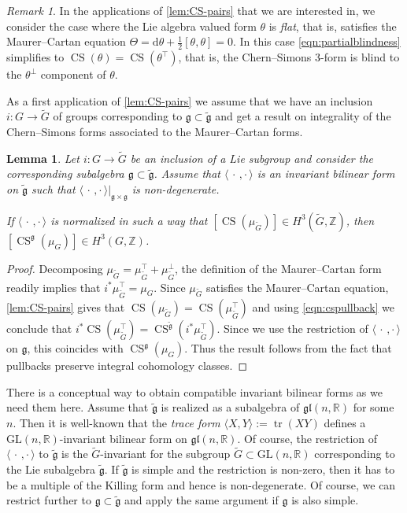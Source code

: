 \documentclass[british,11pt,a4paper]{amsart}
\numberwithin{equation}{section}
\renewcommand\frak{\mathfrak}
\newcommand{\x}{\times}
\newcommand{\deq}{:=}
\newcommand{\B}[2]{\langle#1,#2\rangle}
\newcommand{\CS}{\operatorname{CS}}
\newcommand{\tr}{\operatorname{tr}}
\newcommand{\Z}{\mathbb{Z}}
\renewcommand*{\d}{\mathrm{d}}
\newcommand*{\R}{\mathbb{R}}
\newcommand{\col}{:}
\newcounter{theorem}
\numberwithin{theorem}{section}
\newtheorem{lemma}[theorem]{Lemma}
\theoremstyle{definition}
\theoremstyle{remark}
\newtheorem{remark}[theorem]{Remark}
\begin{document}
\begin{remark}
In the applications of \cref{lem:CS-pairs} that we are interested in, we consider the case where the Lie algebra valued form $\theta$ is \emph{flat}, that is, satisfies the Maurer--Cartan equation $\Theta=\d\theta+\tfrac{1}{2}[\theta,\theta]=0$. In this case \eqref{eqn:partialblindness} simplifies to $\CS(\theta)=\CS(\theta^{\top})$, that is, the Chern--Simons $3$-form is blind to the $\theta^{\perp}$ component of $\theta$. 
\end{remark}

 As a first application of \cref{lem:CS-pairs} we assume that we have an inclusion
$i\col G\to\tilde G$ of groups corresponding to $\frak{g}\subset\tilde{\frak{g}}$ and get a
result on integrality of the Chern--Simons forms associated to the Maurer--Cartan
forms.
\begin{lemma}\label{lem:CS-subgroup}
Let $i\col G\to\tilde G$ be an inclusion of a Lie subgroup and consider the corresponding
subalgebra $\frak{g}\subset\tilde{\frak{g}}$. Assume that $\B{\,\cdot\,}{\cdot\,}$ is an
invariant bilinear form on $\tilde{\frak{g}}$ such that $\B{\,\cdot\,}{\cdot\,}|_{\frak{g}\x\frak
g}$ is non-degenerate.

If $\B{\,\cdot\,}{\cdot\,}$ is normalized in such a way that $[\CS(\mu_{\tilde G})]\in
H^3(\tilde G,\Z)$, then $[\CS^{\frak{g}}(\mu_G)]\in H^3(G,\Z)$.
\end{lemma}
\begin{proof}
Decomposing $\mu_{\tilde G}=\mu_{\tilde G}^\top+\mu_{\tilde G}^\perp$, the
definition of the Maurer--Cartan form readily implies that $i^*\mu_{\tilde
G}^\top=\mu_G$. Since $\mu_{\tilde G}$ satisfies the Maurer--Cartan equation,
\cref{lem:CS-pairs} gives that $\CS(\mu_{\tilde G})=\CS(\mu_{\tilde
G}^\top)$ and using \eqref{eqn:cspullback} we conclude that $i^*\CS(\mu_{\tilde
G}^\top)=\CS^{\tilde{\frak{g}}}(i^*\mu_{\tilde G}^\top)$. Since we use the
restriction of $\B{\,\cdot\,}{\cdot\,}$ on $\frak{g}$, this coincides with $\CS^{\frak
g}(\mu_G)$. Thus the result follows from the fact that pullbacks preserve
integral cohomology classes.
\end{proof}

There is a conceptual way to obtain compatible invariant bilinear forms as we need
them here. Assume that $\tilde{\frak{g}}$ is realized as a subalgebra of
$\frak{gl}(n,\R)$ for some $n$. Then it is well-known that the \textit{trace form}
$\B{X}{Y}\deq\tr(XY)$ defines a $\mathrm{GL}(n,\R)$-invariant bilinear form on
$\frak{gl}(n,\R)$. Of course, the restriction of $\B{\,\cdot\,}{\cdot\,}$ to $\tilde{\frak{g}}$
is the $\tilde G$-invariant for the subgroup $\tilde G\subset \mathrm{GL}(n,\R)$ corresponding
to the Lie subalgebra $\tilde{\frak{g}}$. If $\tilde{\frak g}$ is simple and the
restriction is non-zero, then it has to be a multiple of the Killing form and hence
is non-degenerate. Of course, we can restrict further to
$\frak{g}\subset\tilde{\frak{g}}$ and apply the same argument if $\frak{g}$ is also
simple.
\end{document}
